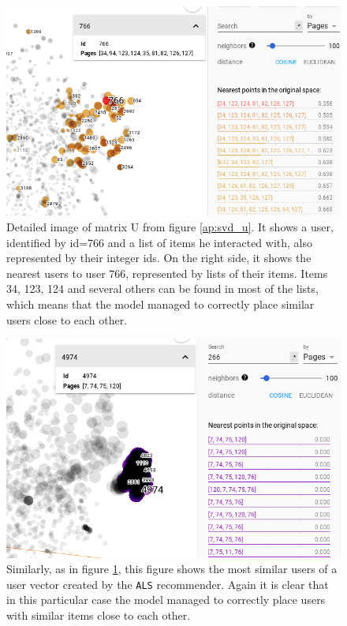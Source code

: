 \begin{figure}[H]
    \centering
    \includegraphics[scale=0.55]{obrazky-figures/svd_uid2.png}
    \caption{Detailed image of matrix U from figure \ref{ap:svd_u}. It shows a user, identified by id=766 and a list of items he interacted with, also represented by their integer ids. On the right side, it shows the nearest users to user 766, represented by lists of their items. Items 34, 123, 124 and several others can be found in most of the lists, which means that the model managed to correctly place similar users close to each other.}
    \label{ap:svd_detail}
\end{figure}

\begin{figure}[H]
    \centering
    \includegraphics[scale=0.55]{obrazky-figures/als_similarities.png}
    \caption{Similarly, as in figure \ref{ap:svd_detail}, this figure shows the most similar users of a user vector created by the \texttt{ALS} recommender. Again it is clear that in this particular case the model managed to correctly place users with similar items close to each other.}
\end{figure}


